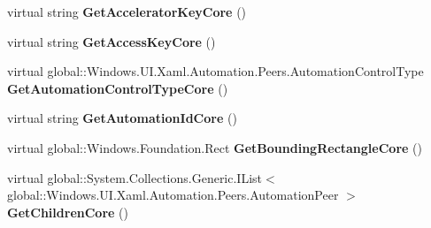 \begin{DoxyCompactItemize}
\item 
\mbox{\label{class_windows_1_1_u_i_1_1_xaml_1_1_automation_1_1_peers_1_1_automation_peer_a9781a8d9c5fdebc0deb28ddc4586e09a}} 
virtual string {\bfseries Get\+Accelerator\+Key\+Core} ()
\item 
\mbox{\label{class_windows_1_1_u_i_1_1_xaml_1_1_automation_1_1_peers_1_1_automation_peer_a3d4baa373625c8c650d5f410d99b44ba}} 
virtual string {\bfseries Get\+Access\+Key\+Core} ()
\item 
\mbox{\label{class_windows_1_1_u_i_1_1_xaml_1_1_automation_1_1_peers_1_1_automation_peer_af2422569cceaff985ea73cae254225e7}} 
virtual global\+::\+Windows.\+U\+I.\+Xaml.\+Automation.\+Peers.\+Automation\+Control\+Type {\bfseries Get\+Automation\+Control\+Type\+Core} ()
\item 
\mbox{\label{class_windows_1_1_u_i_1_1_xaml_1_1_automation_1_1_peers_1_1_automation_peer_a014ee70abfd483498acd60d958afc21e}} 
virtual string {\bfseries Get\+Automation\+Id\+Core} ()
\item 
\mbox{\label{class_windows_1_1_u_i_1_1_xaml_1_1_automation_1_1_peers_1_1_automation_peer_a3c155bdaac9b35e1c7bb423d47fd707d}} 
virtual global\+::\+Windows.\+Foundation.\+Rect {\bfseries Get\+Bounding\+Rectangle\+Core} ()
\item 
\mbox{\label{class_windows_1_1_u_i_1_1_xaml_1_1_automation_1_1_peers_1_1_automation_peer_a09114f6788a9e206e93a6ffbd12620bf}} 
virtual global\+::\+System.\+Collections.\+Generic.\+I\+List$<$ global\+::\+Windows.\+U\+I.\+Xaml.\+Automation.\+Peers.\+Automation\+Peer $>$ {\bfseries Get\+Children\+Core} ()
\item 
\mbox{\label{class_windows_1_1_u_i_1_1_xaml_1_1_automation_1_1_peers_1_1_automation_peer_a11d5725a1c02165300ffbcf264f7b2b3}} 

\end{DoxyCompactItemize}
